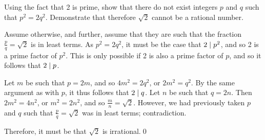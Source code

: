 Using the fact that 2 is prime, show that there do not exist integers $p$ and $q$ such that $p^2 = 2q^2$. Demonstrate that therefore $\sqrt{2}$ cannot be a rational number.
\hr

Assume otherwise, and further, assume that they are such that the fraction $\frac{p}{q} = \sqrt{2}$ is in least terms. As $p^2 = 2q^2$, it must be the case that $2 \mid p^2$, and so 2 is a prime factor of $p^2$. This is only possible if 2 is also a prime factor of $p$, and so it follows that $2 \mid p$.

Let $m$ be such that $p = 2m$, and so $4m^2 = 2q^2$, or $2m^2 = q^2$. By the same argument as with $p$, it thus follows that $2 \mid q$. Let $n$ be such that $q = 2n$. Then $2m^2 = 4n^2$, or $m^2 = 2n^2$, and so $\frac{m}{n} = \sqrt{2}$. However, we had previously taken $p$ and $q$ such that $\frac{p}{q} = \sqrt{2}$ was in least terms; contradiction.

Therefore, it must be that $\sqrt{2}$ is irrational.\qed
